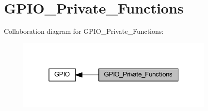 \hypertarget{group___g_p_i_o___private___functions}{}\section{G\+P\+I\+O\+\_\+\+Private\+\_\+\+Functions}
\label{group___g_p_i_o___private___functions}
Collaboration diagram for G\+P\+I\+O\+\_\+\+Private\+\_\+\+Functions\+:
\nopagebreak
\begin{figure}[H]
\begin{center}
\leavevmode
\includegraphics[width=280pt]{group___g_p_i_o___private___functions}
\end{center}
\end{figure}
